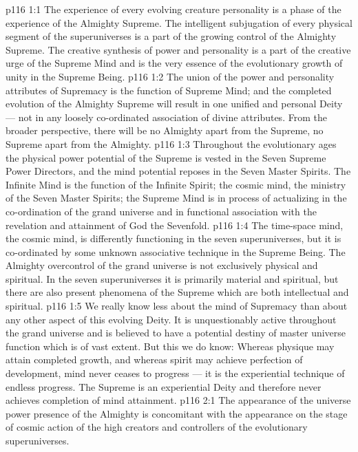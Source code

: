 \vs p116 1:1 The experience of every evolving creature personality is a phase of the experience of the Almighty Supreme. The intelligent subjugation of every physical segment of the superuniverses is a part of the growing control of the Almighty Supreme. The creative synthesis of power and personality is a part of the creative urge of the Supreme Mind and is the very essence of the evolutionary growth of unity in the Supreme Being.
\vs p116 1:2 The union of the power and personality attributes of Supremacy is the function of Supreme Mind; and the completed evolution of the Almighty Supreme will result in one unified and personal Deity --- not in any loosely co\hyp{}ordinated association of divine attributes. From the broader perspective, there will be no Almighty apart from the Supreme, no Supreme apart from the Almighty.
\vs p116 1:3 Throughout the evolutionary ages the physical power potential of the Supreme is vested in the Seven Supreme Power Directors, and the mind potential reposes in the Seven Master Spirits. The Infinite Mind is the function of the Infinite Spirit; the cosmic mind, the ministry of the Seven Master Spirits; the Supreme Mind is in process of actualizing in the co\hyp{}ordination of the grand universe and in functional association with the revelation and attainment of God the Sevenfold.
\vs p116 1:4 \pc The time\hyp{}space mind, the cosmic mind, is differently functioning in the seven superuniverses, but it is co\hyp{}ordinated by some unknown associative technique in the Supreme Being. The Almighty overcontrol of the grand universe is not exclusively physical and spiritual. In the seven superuniverses it is primarily material and spiritual, but there are also present phenomena of the Supreme which are both intellectual and spiritual.
\vs p116 1:5 We really know less about the mind of Supremacy than about any other aspect of this evolving Deity. It is unquestionably active throughout the grand universe and is believed to have a potential destiny of master universe function which is of vast extent. But this we do know: Whereas physique may attain completed growth, and whereas spirit may achieve perfection of development, mind never ceases to progress --- it is the experiential technique of endless progress. The Supreme is an experiential Deity and therefore never achieves completion of mind attainment.
\vs p116 2:1 The appearance of the universe power presence of the Almighty is concomitant with the appearance on the stage of cosmic action of the high creators and controllers of the evolutionary superuniverses.
